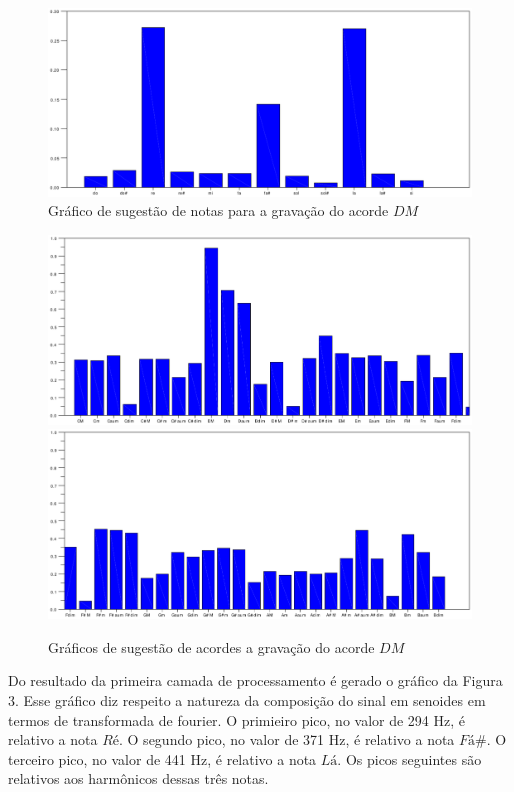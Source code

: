 \begin{figure}[h]
	\centering
		\includegraphics[keepaspectratio=true,scale=0.49]{figuras/Dm/notas_DM.eps}
	\caption{Gráfico de sugestão de notas para a gravação do acorde $DM$}
\end{figure}

\begin{figure}[h]
	\centering
		\includegraphics[keepaspectratio=true,scale=0.45]{figuras/Dm/acordes_1_DM.eps}
		\includegraphics[keepaspectratio=true,scale=0.45]{figuras/Dm/acordes_2_DM.eps}
	\caption{Gráficos de sugestão de acordes a gravação do acorde $DM$}
\end{figure}
\newpage
Do resultado da primeira camada de processamento é gerado o gráfico da Figura 3. Esse gráfico diz respeito a natureza da composição do sinal em senoides em termos de transformada de fourier. O primieiro pico, no valor de 294 Hz, é relativo a nota $Ré$. O segundo pico, no valor de 371 Hz, é relativo a nota $Fá\#$. O terceiro pico, no valor de 441 Hz, é relativo a nota $Lá$. Os picos seguintes são relativos aos harmônicos dessas três notas. 

